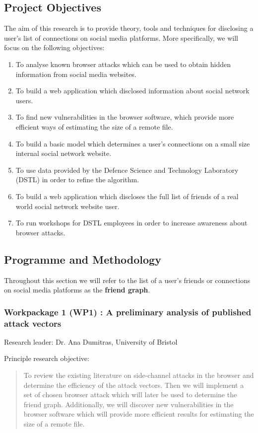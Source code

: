 \documentclass[a4paper,11pt]{article}
\begin{document}
\subsection*{Project Objectives}

The aim of this research is to provide theory, tools and techniques for disclosing a user's list of connections on social media platforms. More specifically, we will focus on the following objectives:
\begin{enumerate}
\item To analyse known browser attacks which can be used to obtain hidden information from social media websites.
\item To build a web application which disclosed information about social network users.
\item To find new vulnerabilities in the browser software, which provide more efficient ways of estimating the size of a remote file.
\item To build a basic model which determines a user's connections on a small size internal social network website.
\item To use data provided by the Defence Science and Technology Laboratory (DSTL) in order to refine the algorithm.
\item To build a web application which discloses the full list of friends of a real world social network website user.
\item To run workshops for DSTL employees in order to increase awareness about browser attacks.
\end{enumerate}

\subsection*{Programme and Methodology}

Throughout this section we will refer to the list of a user's friends or connections on social media platforms as the \textbf{friend graph}.

\subsubsection*{Workpackage 1 (WP1) : A preliminary analysis of published attack vectors}
Research leader: Dr. Ana Dumitras, University of Bristol

Principle research objective:
\begin{quote}
	To review the existing literature on side-channel attacks in the browser and determine the efficiency of the attack vectors. Then we will implement a set of chosen browser attack which will later be used to determine the friend graph. Additionally, we will discover new vulnerabilities in the browser software which will provide more efficient results for estimating the size of a remote file.
\end{quote}
\end{document}
